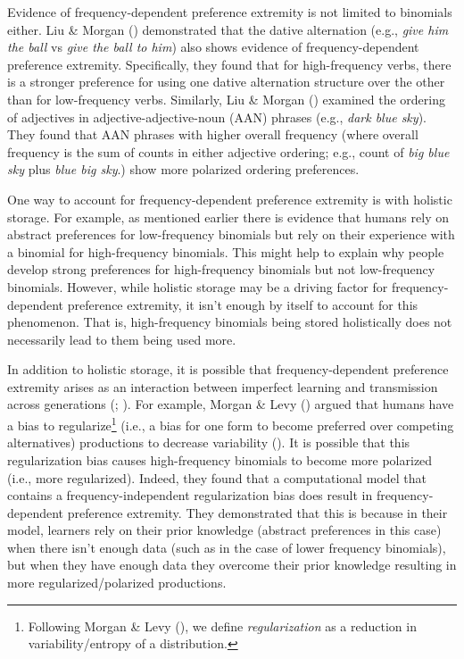 \documentclass[
  12pt,
]{scrartcl}
\begin{document}
Evidence of frequency-dependent preference extremity is not limited to
binomials either. Liu \& Morgan
()
demonstrated that the dative alternation (e.g., \emph{give him the ball}
vs \emph{give the ball to him}) also shows evidence of
frequency-dependent preference extremity. Specifically, they found that
for high-frequency verbs, there is a stronger preference for using one
dative alternation structure over the other than for low-frequency
verbs. Similarly, Liu \& Morgan
()
examined the ordering of adjectives in adjective-adjective-noun (AAN)
phrases (e.g., \emph{dark blue sky}). They found that AAN phrases with
higher overall frequency (where overall frequency is the sum of counts
in either adjective ordering; e.g., count of \emph{big blue sky} plus
\emph{blue big sky}.) show more polarized ordering preferences.

One way to account for frequency-dependent preference extremity is with
holistic storage. For example, as mentioned earlier there is evidence
that humans rely on abstract preferences for low-frequency binomials but
rely on their experience with a binomial for high-frequency binomials.
This might help to explain why people develop strong preferences for
high-frequency binomials but not low-frequency binomials. However, while
holistic storage may be a driving factor for frequency-dependent
preference extremity, it isn't enough by itself to account for this
phenomenon. That is, high-frequency binomials being stored holistically
does not necessarily lead to them being used more.

In addition to holistic storage, it is possible that frequency-dependent
preference extremity arises as an interaction between imperfect learning
and transmission across generations
(;
). For example, Morgan \& Levy
()
argued that humans have a bias to regularize\footnote{Following Morgan
  \& Levy
  (),
  we define \emph{regularization} as a reduction in variability/entropy
  of a distribution.} (i.e., a bias for one form to become preferred
over competing alternatives) productions to decrease variability
(). It is possible that this regularization bias
causes high-frequency binomials to become more polarized (i.e., more
regularized). Indeed, they found that a computational model that
contains a frequency-independent regularization bias does result in
frequency-dependent preference extremity. They demonstrated that this is
because in their model, learners rely on their prior knowledge (abstract
preferences in this case) when there isn't enough data (such as in the
case of lower frequency binomials), but when they have enough data they
overcome their prior knowledge resulting in more regularized/polarized
productions.
\end{document}
